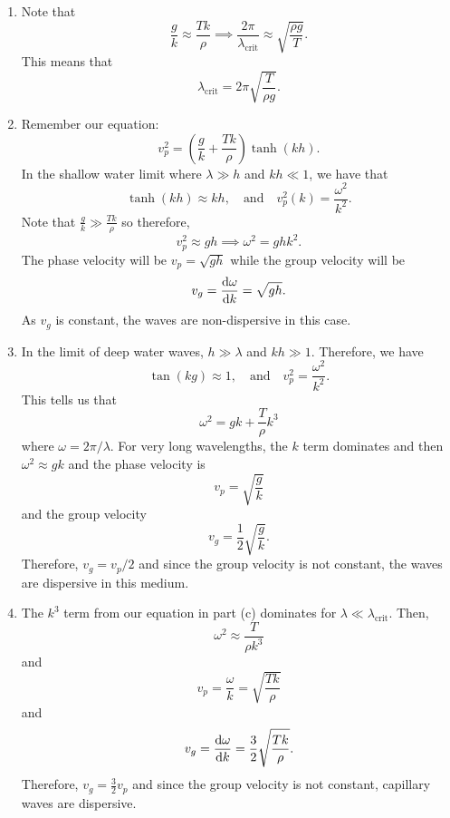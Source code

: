 \begin{sol}
\begin{enumerate}[label=\textbf{(\alph*)}]
\item Note that 
\[\frac{g}{k}\approx \frac{Tk}{\rho}\implies \frac{2\pi}{\lambda_{\text{crit}}} \approx \sqrt{\frac{\rho g}{T}}.\]
This means that 
\[\lambda_{\text{crit}} = 2\pi \sqrt{\frac{T}{\rho g}}.\]

\item Remember our equation:
\[v_p^2 = \left(\frac{g}{k} + \frac{Tk}{\rho}\right)\tanh (kh).\]
In the shallow water limit where $\lambda \gg h$ and $kh\ll 1$, we have that 
\[\tanh (kh) \approx kh, \quad \text{and} \quad v_p^2 (k) = \frac{\omega^2}{k^2}.\]
Note that $\frac{g}{k} \gg \frac{Tk}{\rho}$ so therefore, 
\[v_p^2 \approx gh \implies \omega^2 = gh k^2.\]
The phase velocity will be $v_p = \sqrt{gh}$ while the group velocity will be 
\[v_g = \dv{\omega}{k} = \sqrt{gh}.\]
As $v_g$ is constant, the waves are non-dispersive in this case. 

\item In the limit of deep water waves, $h\gg \lambda$ and $kh \gg 1$. Therefore, we have 
\[\tan (kg) \approx 1, \quad \text{and} \quad v_p^2 = \frac{\omega^2}{k^2}.\]
This tells us that 
\[\omega^2 = gk + \frac{T}{\rho}k^3\]
where $\omega = 2\pi/\lambda$. For very long wavelengths, the $k$ term dominates and then $\omega^2 \approx gk$ and the phase velocity is 
\[v_p = \sqrt{\frac{g}{k}}\]
and the group velocity
\[v_g = \frac{1}{2}\sqrt{\frac{g}{k}}.\]
Therefore, $v_g = v_p/2$ and since the group velocity is not constant, the waves are dispersive in this medium. 

\item The $k^3$ term from our equation in part (c) dominates for $\lambda \ll \lambda_{\text{crit}}$. Then, 
\[\omega^2 \approx \frac{T}{\rho k^3}\]
and 
\[v_p = \frac{\omega}{k} = \sqrt{\frac{Tk}{\rho}}\]
and 
\[v_g = \dv{\omega}{k} = \frac{3}{2}\sqrt{\frac{Tk}{\rho}}.\]
Therefore, $v_g = \frac{3}{2}v_p$ and since the group velocity is not constant, capillary waves are dispersive. 
\end{enumerate}
\end{sol}